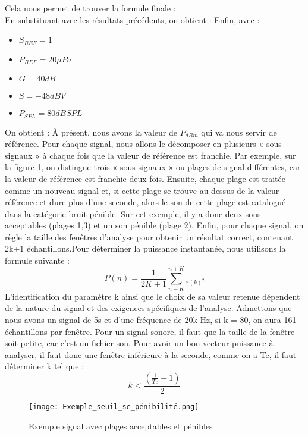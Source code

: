 Cela nous permet de trouver la formule finale : 
\\
En substituant avec les résultats précédents, on obtient :
Enfin, avec : \begin{itemize}
    \item $S_{REF} = 1$
    \item $P_{REF} = 20 \mu Pa$
    \item $G = 40 dB$
    \item $S = -48 dBV$
    \item $P_{SPL} = 80 dB SPL$
\end{itemize} 
On obtient : 
À présent, nous avons la valeur de $P_{dBm}$ qui va nous servir de référence. Pour chaque signal, nous allons le décomposer en plusieurs « sous-signaux » à chaque fois que la valeur de référence est franchie. 
Par exemple, sur la figure \ref{Fig.1.2}, on distingue trois « sous-signaux » ou plages de signal différentes, car la valeur de référence est franchie deux fois. Ensuite, chaque plage est traitée comme un nouveau signal et, si cette plage se trouve au-dessus de la valeur référence et dure plus d’une seconde, alors le son de cette plage est catalogué dans la catégorie bruit pénible. Sur cet exemple, il y a donc deux sons acceptables (plages 1,3) et un son pénible (plage 2).
Enfin, pour chaque signal, on règle la taille des fenêtres d’analyse pour obtenir un résultat correct, contenant 2k+1 échantillons.Pour déterminer la puissance instantanée, nous utilisons la formule suivante :
\begin{equation}
    P(n) = \frac{1}{2K+1}\sum_{n-K}^{n+K}_{x(k)^2}
\end{equation}
L'identification du paramètre k ainsi que le choix de sa valeur retenue dépendent de la nature du signal et des exigences spécifiques de l'analyse. Admettons que nous avons un signal de 5s et d'une fréquence de 20k Hz, si k = 80, on aura 161 échantillons par fenêtre. Pour un signal sonore, il faut que la taille de la fenêtre soit petite, car c'est un fichier son. Pour avoir un bon vecteur puissance à analyser, il faut donc une fenêtre inférieure à la seconde, comme on a Te, il faut déterminer k tel que :
\begin{equation}
    k < \frac{(\frac{1}{Te}-1)}{2}
\end{equation}
\begin{figure}[htb]
    \centering
    \texttt{[image: Exemple\_seuil\_se\_pénibilité.png]}
    \caption{Exemple signal avec plages acceptables et pénibles}
    \label{Fig.1.2}
\end{figure}

